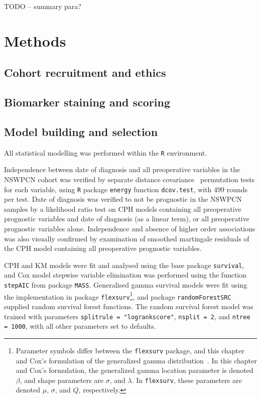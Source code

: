 \documentclass[dissertation.tex]{subfiles}
\begin{document}
TODO -- summary para?

\section{Methods}
\subsection{Cohort recruitment and ethics}
\label{subsec:nomo-methods-cohort}

\subsection{Biomarker staining and scoring}

\subsection{Model building and selection}
All statistical modelling was performed within the \texttt{R} environment.

Independence between date of diagnosis and all preoperative variables in the \gls{NSWPCN} cohort was verified by separate distance covariance~\cite{Szekely2013} permutation tests for each variable, using \texttt{R} package \texttt{energy} function \texttt{dcov.test}, with 499 rounds per test.  Date of diagnosis was verified to not be prognostic in the \gls{NSWPCN} samples by a likelihood ratio test on \gls{CPH} models containing all preoperative prognostic variables and date of diagnosis (as a linear term), or all preoperative prognostic variables alone.  Independence and absence of higher order associations was also visually confirmed by examination of smoothed martingale residuals of the \gls{CPH} model containing all preoperative prognostic variables.

\gls{CPH} and \gls{KM} models were fit and analysed using the base package \texttt{survival}, and Cox model stepwise variable elimination was performed using the function \texttt{stepAIC} from package \texttt{MASS}.  Generalised gamma survival models were fit using the implementation in package \texttt{flexsurv}\footnote{Parameter symbols differ between the \texttt{flexsurv} package, and this chapter and Cox's formulation of the generalized gamma distribution~\cite{Cox2007}.  In this chapter and Cox's formulation, the generalized gamma location parameter is denoted $\beta$, and shape parameters are $\sigma$, and $\lambda$.  In \texttt{flexsurv}, these parameters are denoted $\mu$, $\sigma$, and $Q$, respectively.}, and package \texttt{randomForestSRC} supplied random survival forest functions.  The random survival forest model was trained with parameters \texttt{splitrule = "logrankscore"}, \texttt{nsplit = 2}, and \texttt{ntree = 1000}, with all other parameters set to defaults.
\end{document}
